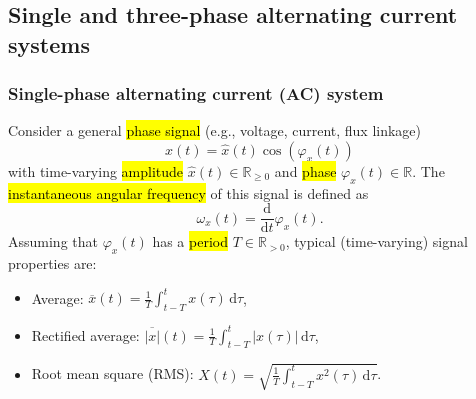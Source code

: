 \subsection{Single and three-phase alternating current systems}
\label{subsec:single_three_phase_AC_systems}


\begin{frame}
    \frametitle{Single-phase alternating current (AC) system}
    Consider a general \hl{phase signal} (e.g., voltage, current, flux linkage)
    \begin{equation}
        x(t) = \hat{x}(t)\cos(\varphi_x(t))
    \end{equation}
    with time-varying \hl{amplitude} $\hat{x}(t)\in\mathbb{R}_{\geq 0}$ and \hl{phase} $\varphi_x(t)\in\mathbb{R}$. \pause The \hl{instantaneous angular frequency} of this signal is defined as
    \begin{equation}
        \omega_x(t) = \frac{\mathrm{d}}{\mathrm{d}t}\varphi_x(t).
    \end{equation}\pause
    Assuming that $\varphi_x(t)$ has a \hl{period} $T\in\mathbb{R}_{>0}$, typical (time-varying) signal properties are:
    \begin{itemize}
        \item Average: $\overline{x}(t)=\frac{1}{T}\int_{t-T}^{t} x(\tau) \, \mathrm{d}\tau$,\pause
        \item Rectified average: $\overline{|x|}(t)=\frac{1}{T}\int_{t-T}^{t} |x(\tau)| \, \mathrm{d}\tau$,\pause
        \item Root mean square (RMS): $X(t)=\sqrt{\frac{1}{T}\int_{t-T}^{t} x^2(\tau) \, \mathrm{d}\tau}$.
    \end{itemize}
\end{frame}


